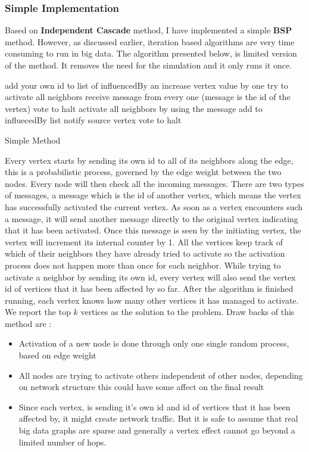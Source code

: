 \documentclass[english]{tktltiki}
\begin{document}
\subsubsection{Simple Implementation}
Based on \cite{kempe03} \textbf{Independent Cascade} method, I have implemented a simple \textbf{BSP} method. However, as discussed earlier, iteration based algorithms are very time consuming to run in big data. The algorithm presented below, is limited version of the method. It removes the need for the simulation and it only runs it once. 
\begin{algorithm}[ht!]
\begin{algorithmic}
	\State add your own id to list of influencedBy an increase vertex value by one
	\State try to activate all neighbors 
\Else
	\State receive message from every one (message is the id of the vertex)
			\State vote to halt
		\Else
			\State activate all neighbors by using the message
			\State add to influecedBy list
			\State notify source vertex
			\State vote to halt
		\EndIf
		
	\EndFor
\EndIf
\end{algorithmic}
\caption{Simple Method}
\end{algorithm}

Every vertex starts by sending its own id to all of its neighbors along the edge, this is a probabilistic process, governed by the edge weight between the two nodes. Every node will then check all the incoming messages. There are two types of messages, a message which is the id of another vertex, which means the vertex has successfully activated the current vertex. As soon as a vertex encounters such a message, it will send another message directly to the original vertex indicating that it has been activated. Once this message is seen by the initiating vertex, the vertex will increment its internal counter by 1. All the vertices keep track of which of their neighbors they have already tried to activate so the activation process does not happen more than once for each neighbor. While trying to activate a neighbor by sending its own id, every vertex will also send the vertex id of vertices that it has been affected by so far. After the algorithm is finished running, each vertex knows how many other vertices it has managed to activate. We report the top $k$ vertices as the solution to the problem. Draw backs of this method are :
\begin{itemize}
\item Activation of a new node is done through only one single random process, based on edge weight
\item All nodes are trying to activate others independent of other nodes, depending on network structure this could have some affect on the final result
\item Since each vertex, is sending it's own id and id of vertices that it has been affected by, it might create network traffic. But it is safe to assume that real big data graphs are sparse and generally a vertex effect cannot go beyond a limited number of hops.

\end{itemize}
\end{document}
